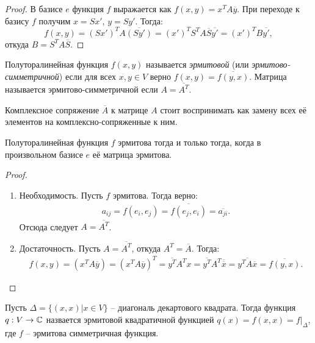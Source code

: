\begin{proof}
    В базисе $e$ функция $f$ выражается как $f(x, y) = x^T A \overline{y}$. При переходе к базису 
    $f$ получим $x = S x'$, $y =  S y'$. Тогда:
    $$f(x, y) = (Sx')^T A \overline{(Sy')} = (x')^T S^TA \overline{S} \overline{y'} = (x')^TB\overline{y'},$$
    откуда $B = S^TA\overline{S}$.
\end{proof}

\begin{definition}
    Полуторалинейная функция $f(x, y)$ называется \textit{эрмитовой} (или \textit{эрмитово-симметричной}) если для всех 
    $x, y \in V$ верно $f(x, y) = \overline{f(y, x)}$. Матрица называется эрмитово-симметричной если 
    $A = \overline{A^T}$. 
\end{definition}

\begin{note}
    Комплексное сопряжение $\overline{A}$ к матрице $A$ стоит воспринимать как замену всех её элементов 
    на комплексно-сопряженные к ним.
\end{note}

\begin{proposition}
    Полуторалинейная функция $f$ эрмитова тогда и только тогда, когда в произвольном базисе $e$ её 
    матрица эрмитова.
\end{proposition}

\begin{proof}~
    \begin{enumerate}
        \item Необходимость. Пусть $f$ эрмитова. Тогда верно: \begin{gather*}
            a_{ij} = f(e_i, e_j) = \overline{f(e_j, e_i)} = \overline{a_{ji}}.
        \end{gather*} Отсюда следует $A = \overline{A^T}$.
        \item Достаточность. Пусть $A = \overline{A^T}$, откуда $A^T = \overline{A}$.
        Тогда: 
        \begin{gather*}
            f(x, y) = (x^T A \overline{y}) = (x^T A \overline{y})^T = \overline{y^T} A^T x = 
            \overline{y^T} A^T \overline{\overline{x}} = \overline{y^T A \overline{x}} = \overline{f(y, x)}.
        \end{gather*}
    \end{enumerate}
\end{proof}

\begin{definition}
    Пусть $\Delta = \{(x, x) \vert x \in V\}$ -- диагональ декартового квадрата. Тогда функция $q: V \to \mathbb{C}$ 
    назвается эрмитовой квадратичной функцией $q(x) = f(x, x) = f \vert_{\Delta}$, где $f$ -- эрмитова 
    симметричная функция.
\end{definition}

